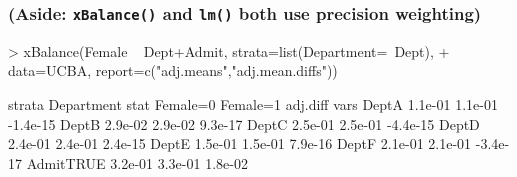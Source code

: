 \begin{frame}[fragile]
  \frametitle{(Aside: \texttt{xBalance()} and \texttt{lm()} both use precision weighting)}

\begin{Schunk}
\begin{Sinput}
> xBalance(Female ~ Dept+Admit, strata=list(Department=~Dept),
+          data=UCBA, report=c("adj.means","adj.mean.diffs"))
\end{Sinput}
\begin{Soutput}
          strata Department                           
          stat     Female=0 Female=1 adj.diff         
vars                                                  
DeptA              1.1e-01  1.1e-01  -1.4e-15         
DeptB              2.9e-02  2.9e-02  9.3e-17          
DeptC              2.5e-01  2.5e-01  -4.4e-15         
DeptD              2.4e-01  2.4e-01  2.4e-15          
DeptE              1.5e-01  1.5e-01  7.9e-16          
DeptF              2.1e-01  2.1e-01  -3.4e-17         
AdmitTRUE          3.2e-01  3.3e-01  1.8e-02          
\end{Soutput}
\end{Schunk}
\end{frame}

